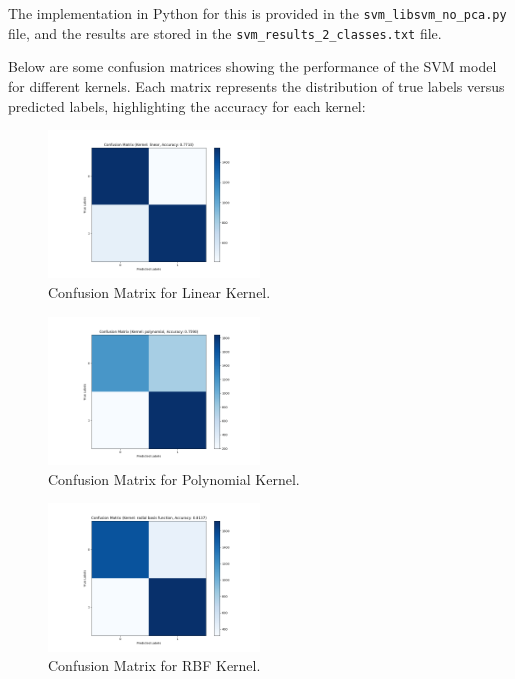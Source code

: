 \documentclass[lettersize,journal]{IEEEtran}
\begin{document}
\vspace{0.3cm}
The implementation in Python for this is provided in the \texttt{svm\_libsvm\_no\_pca.py} file, and the results are stored in the \texttt{svm\_results\_2\_classes.txt} file.

Below are some confusion matrices showing the performance of the SVM model for different kernels. Each matrix represents the distribution of true labels versus predicted labels, highlighting the accuracy for each kernel:
\begin{figure}[H]
    \centering
    \includegraphics[width=0.5\textwidth]{confusion_matrix_2_classes_linear.png}
    \caption{Confusion Matrix for Linear Kernel.}
    \label{fig:confusion-matrix-linear}
\end{figure}
\begin{figure}[H]
    \centering
    \includegraphics[width=0.5\textwidth]{confusion_matrix_2_classes_polynomial.png}
    \caption{Confusion Matrix for Polynomial Kernel.}
    \label{fig:confusion-matrix-polynomial}
\end{figure}
\begin{figure}[H]
    \centering
    \includegraphics[width=0.5\textwidth]{confusion_matrix_2_classes_radial basis function.png}
    \caption{Confusion Matrix for RBF Kernel.}
    \label{fig:confusion-matrix-RBF}
\end{figure}
\end{document}
